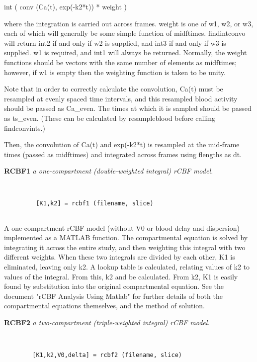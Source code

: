         int ( conv (Ca(t), exp(-k2*t)) * weight )
 
  where the integration is carried out across frames.  weight is
  one of w1, w2, or w3, each of which will generally be some simple
  function of midftimes.  findintconvo will return int2 if and only if
  w2 is supplied, and int3 if and only if w3 is supplied.  w1 is 
  required, and int1 will always be returned.  Normally, the weight
  functions should be vectors with the same number of elements as
  midftimes; however, if w1 is empty then the weighting function 
  is taken to be unity.
 
  Note that in order to correctly calculate the convolution, Ca(t) must
  be resampled at evenly spaced time intervals, and this resampled blood
  activity should be passed as Ca\_even.  The times at which it is
  sampled should be passed as ts\_even.  (These can be calculated by
  resampleblood before calling findconvints.)
 
  Then, the convolution of Ca(t) and exp(-k2*t) is resampled at the
  mid-frame times (passed as midftimes) and integrated across frames
  using flengths as dt.
\newpage


{\large\bf RCBF1} {\em a one-compartment (double-weighted integral) rCBF model.}
\begin{verbatim}


         [K1,k2] = rcbf1 (filename, slice)


\end{verbatim}

  A one-compartment rCBF model (without V0 or blood delay and 
  dispersion) implemented as a MATLAB function.  The
  compartmental equation is solved by integrating it across
  the entire study, and then weighting this integral with two
  different weights.  When these two integrals are divided by
  each other, K1 is eliminated, leaving only k2.  A lookup
  table is calculated, relating values of k2 to values of the
  integral.  From this, k2 and be calculated.  From k2, K1 is
  easily found by substitution into the original compartmental
  equation.  See the document "rCBF Analysis Using Matlab" for
  further details of both the compartmental equations
  themselves, and the method of solution.
\newpage


{\large\bf RCBF2} {\em a two-compartment (triple-weighted integral) rCBF model.}
\begin{verbatim}


        [K1,k2,V0,delta] = rcbf2 (filename, slice)


\end{verbatim}

